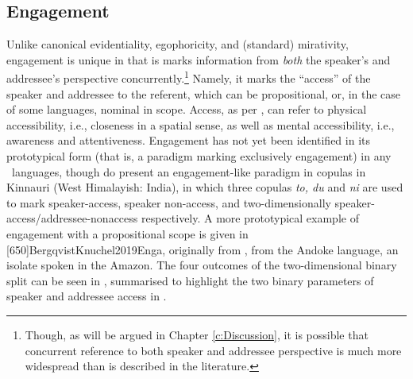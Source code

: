 \subsection{Engagement}\label{s:Intro:EngagementIntro}
Unlike canonical evidentiality, egophoricity, and (standard) mirativity, engagement is unique in that is marks information from \textit{both} the speaker's and addressee's perspective concurrently.\footnote{Though, as will be argued in Chapter \ref{c:Discussion}, it is possible that concurrent reference to both speaker and addressee perspective is much more widespread than is described in the literature.} Namely, it marks the ``access'' \cite[118]{EvansBergqvistSanRoque2018a} of the speaker and addressee to the referent, which can be propositional, or, in the case of some languages, nominal in scope. Access, as per , can refer to physical accessibility, i.e., closeness in a spatial sense, as well as mental accessibility, i.e., awareness and attentiveness. Engagement has not yet been identified in its prototypical form (that is, a paradigm marking exclusively engagement) in any \lfam\ languages, though  do present an engagement-like paradigm in copulas in Kinnauri (West Himalayish: India), in which three copulas \textit{to, du} and \textit{ni} are used to mark speaker-access, speaker non-access, and two-dimensionally speaker-access/addressee-nonaccess respectively. A more prototypical example of engagement with a propositional scope is given in [650]{BergqvistKnuchel2019Enga}, originally from , from the Andoke language, an isolate spoken in the Amazon. The four outcomes of the two-dimensional binary split can be seen in , summarised to highlight the two binary parameters of speaker and addressee access in .

